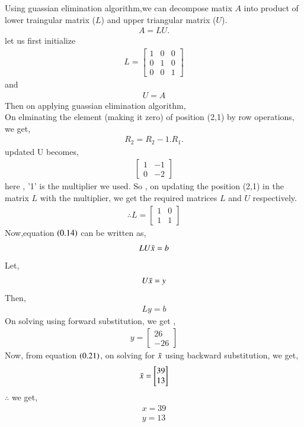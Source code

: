 \documentclass[journal]{IEEEtran}
\begin{document}
 Using guassian elimination algorithm,we can decompose matix $A$ into product of lower traingular matrix ($L$) and upper triangular matrix ($U$).
 \begin{align}
     A = LU.
 \end{align}
 let us first initialize
 \begin{align}
     L = \begin{bmatrix}
         1&0&0\\
         0&1&0\\
         0&0&1
     \end{bmatrix}
 \end{align}
 and 
 \begin{align}
     U = A
 \end{align}
 Then on applying guassian elimination algorithm,\\
 On elminating the element (making it zero) of position (2,1) by row operations, we get,
 \begin{align}
     R_2 = R_2 - 1.R_1.
 \end{align}
 updated U becomes,
\begin{align}
    \begin{bmatrix}
        1&-1\\
        0&-2
    \end{bmatrix}
\end{align}
here , '1' is the multiplier we used.
So , on updating the position (2,1) in the matrix $L$ with the multiplier, we get the required matrices $L$ and $U$ respectively.
\begin{align}
    \therefore L = \begin{bmatrix}
        1&0\\
        1&1
    \end{bmatrix}
\end{align}
Now,equation $\left(0.14\right)$ can be written as,
\begin{align}
    LU\Bar{x} = b
\end{align}
Let,
\begin{align}
    U\Bar{x} = y
\end{align}
Then,
\begin{align}
    Ly = b
\end{align}
On solving using forward substitution, we get , 
\begin{align}
    y = \begin{bmatrix}
        26\\
        -26
    \end{bmatrix}
\end{align}
Now, from equation $\left(0.21\right)$, on solving for $\Bar{x}$ using backward substitution, we get,
\begin{align}
    \Bar{x} = \begin{bmatrix}
        39\\
        13
    \end{bmatrix}
\end{align}
$\therefore$ we get,
\begin{align}
    x = 39\\
    y = 13
\end{align}
\end{document}

